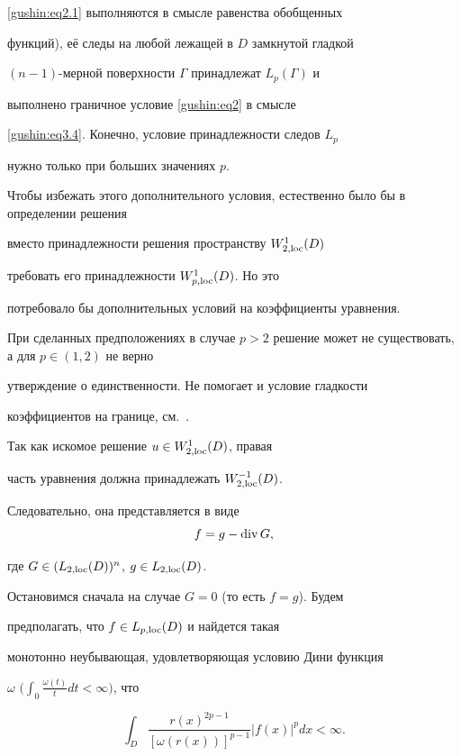 \eqref{gushin:eq2.1} выполняются в смысле равенства обобщенных

функций), её следы на любой лежащей в $D$ замкнутой гладкой

$(n-1)$-мерной поверхности $\Gamma$ принадлежат $L_p(\Gamma)$ и

выполнено граничное условие \eqref{gushin:eq2} в смысле

\eqref{gushin:eq3.4}. Конечно, условие принадлежности следов $L_p$

нужно только при больших значениях $p$. 

Чтобы избежать этого дополнительного условия, естественно было бы в определении решения

вместо принадлежности решения пространству $W_{2,{\rm loc}}^1(D)$

требовать его принадлежности $W_{p,{\rm loc}}^1(D)$. Но это

потребовало бы дополнительных условий на коэффициенты уравнения.

При сделанных предположениях в случае $ p

> 2$ решение может не существовать, а для $p \in (1, 2)$ не верно

утверждение о единственности. Не помогает и условие гладкости

коэффициентов на границе, см.~\cite{gushin:MSB12}.



Так как искомое решение $u \in W_{2,{\rm loc}}^1(D)$, правая

часть уравнения должна принадлежать $W_{2,{\rm loc}}^{-1}(D)$.

Следовательно,  она представляется в виде  $${f = g - \mathop{{\rm div}} G},$$

где $G \in (L_{2,{\rm loc}}(D))^n$, $g \in L_{2,{\rm loc}}(D)$.



Остановимся сначала на случае $G = 0$ (то есть $f = g$). Будем

предполагать, что $f \in L_{p, {\rm loc}}(D)$ и найдется такая

монотонно неубывающая, удовлетворяющая условию Дини функция

$\omega$ $\biggl(\displaystyle \int _0 \frac{\omega (t)}{t} dt < \infty

\biggr)$, что

\begin{equation}

\label{gushin:eq3.6} \int _D \frac{r(x)^{2p-1}}{[\omega

(r(x))]^{p-1}} |f(x)|^p dx < \infty.

\end{equation}

